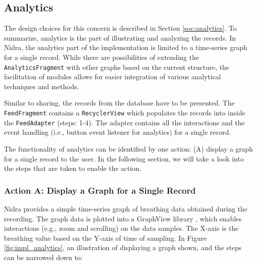\subsection{Analytics}\label{ioc:analytics}
The design choices for this concern is described in Section \ref{soc:analytics}. To summarize, analytics is the part of illustrating and analyzing the records. In Nidra, the analytics part of the implementation is limited to a time-series graph for a single record. While there are possibilities of extending the \verb|AnalyticsFragment| with other graphs based on the current structure, the facilitation of modules allows for easier integration of various analytical techniques and methods.

Similar to sharing, the records from the database have to be presented. The \verb|FeedFragment| contains a \verb|RecyclerView| which populates the records into inside the \verb|FeedAdapter| (steps: 1-4). The adapter contains all the interactions and the event handling (i.e., button event listener for analytics) for a single record. 

The functionality of analytics can be identified by one action: (A) display a graph for a single record to the user. In the following section, we will take a look into the steps that are taken to enable the action.

\subsubsection{Action A: Display a Graph for a Single Record}
Nidra provides a simple time-series graph of breathing data obtained during the recording. The graph data is plotted into a GraphView library \cite{androidgraph}, which enables interactions (e.g., zoom and scrolling) on the data samples. The X-axis is the breathing value based on the Y-axis of time of sampling. In Figure \ref{fig:impl_analytics}, an illustration of displaying a graph shown, and the steps can be narrowed down to:

